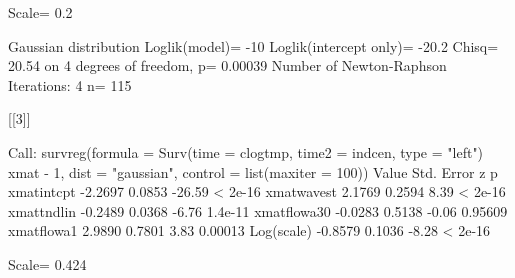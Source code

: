 \documentclass[11pt]{article}
\begin{document}
\begin{Schunk}
\begin{Soutput}
Scale= 0.2 

Gaussian distribution
Loglik(model)= -10   Loglik(intercept only)= -20.2
	Chisq= 20.54 on 4 degrees of freedom, p= 0.00039 
Number of Newton-Raphson Iterations: 4 
n= 115 


[[3]]

Call:
survreg(formula = Surv(time = clogtmp, time2 = indcen, type = "left") ~ 
    xmat - 1, dist = "gaussian", control = list(maxiter = 100))
              Value Std. Error      z       p
xmatintcpt  -2.2697     0.0853 -26.59 < 2e-16
xmatwavest   2.1769     0.2594   8.39 < 2e-16
xmattndlin  -0.2489     0.0368  -6.76 1.4e-11
xmatflowa30 -0.0283     0.5138  -0.06 0.95609
xmatflowa1   2.9890     0.7801   3.83 0.00013
Log(scale)  -0.8579     0.1036  -8.28 < 2e-16

Scale= 0.424 


\end{Soutput}
\end{Schunk}
\end{document}
